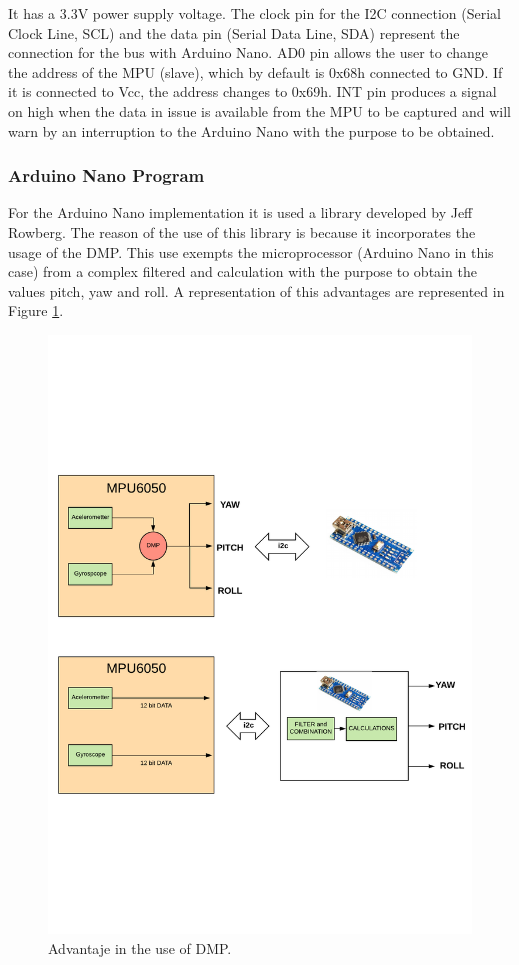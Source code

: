 It has a 3.3V power supply voltage. The clock pin for the I2C connection (Serial Clock Line, SCL) and the data pin (Serial Data Line, SDA) represent the connection for the bus with Arduino Nano. AD0 pin allows the user to change the address of the MPU (slave), which by default is 0x68h connected to GND. If it is connected to Vcc, the address changes to 0x69h. INT pin produces a signal on high when the data in issue is available from the MPU to be captured and will warn by an interruption to the Arduino Nano with the purpose to be obtained.\newline

\subsubsection{Arduino Nano Program}
For the Arduino Nano implementation it is used a library developed by Jeff Rowberg. The reason of the use of this library is because it incorporates the usage of the DMP. This use  exempts the microprocessor (Arduino Nano in this case) from a complex filtered and calculation with the purpose to obtain the values pitch, yaw and roll. A representation of this advantages are represented in Figure \ref{fig:DMPExample}.\newline
\begin{figure}[H]
	\center
	\includegraphics[trim = 0mm 4cm 0mm 2cm, clip,scale=0.6]{imagenes/Balancing_robot/DMPexample.pdf}
	\caption{Advantaje in the use of DMP.}
	\label{fig:DMPExample}
\end{figure} 


